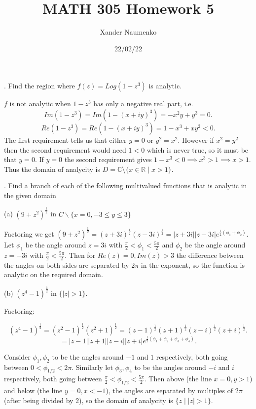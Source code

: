 \documentclass[letterpaper, reqno,11pt]{article}
\begin{document}
\title{MATH 305 Homework 5}
\date{22/02/22}
\author{Xander Naumenko}
\maketitle

 
.  Find the region where $ f(z) =Log (1-z^3)$ is analytic.

\medskip

$f$ is not analytic when $1-z^3$ has only a negative real part, i.e.
\[
Im(1-z^3)=Im(1-(x+iy)^3)=-x^2y+y^3=0
.\]
\[
Re(1-z^3)=Re(1-(x+iy)^3)=1-x^3+xy^2<0
.\]
The first requirement tells us that either $y=0$ or $y^2=x^2$. However if $x^2=y^2$ then the second requirement would need $1<0$ which is never true, so it must be that $y=0$. If $y=0$ the second requirement gives $1-x^3<0\implies x^3>1\implies x>1$. Thus the domain of analycity is $D=\mathbb{C}\setminus \{x\in\mathbb{R} \mid x>1\} $. 


\medskip

. Find a branch of each of the following multivalued functions that is analytic in the given domain

(a) $ (9+z^2)^{\frac{1}{2}}$ in $C \backslash \{ x=0,  -3\leq y \leq 3 \}$

Factoring we get $(9+z^2)^{\frac{1}{2}}=(z+3i)^{\frac{1}{2}}(z-3i)^{\frac{1}{2}}=|z+3i||z-3i|e^{\frac{1}{2}\left( \phi_1+\phi_2 \right) }$. Let $\phi_1$ be the angle around $z=3i$ with $\frac{\pi}{2}<\phi_1<\frac{5\pi}{2}$ and $\phi_2$ be the angle around $z=-3i$ with $\frac{\pi}{2}<\frac{5\pi}{2}$. Then for $Re(z)=0, Im(z)>3$ the difference between the angles on both sides are separated by $2\pi$ in the exponent, so the function is analytic on the required domain. 

(b) $ (z^4-1)^{\frac{1}{2}}$ in $ \{ |z|>1 \}$.

Factoring: 

\[
    (z^{4}-1)^{\frac{1}{2}}=(z^2-1)^{\frac{1}{2}}(z^2+1)^{\frac{1}{2}}=(z-1)^{\frac{1}{2}}(z+1)^{\frac{1}{2}}(z-i)^{\frac{1}{2}}(z+i)^{\frac{1}{2}}
.\]
\[
=|z-1| |z+1| |z-i||z+i|e^{\frac{1}{2}\left( \phi_1+\phi_2+\phi_3+\phi_4 \right) }
.\]

Consider $\phi_1, \phi_2$ to be the angles around $-1$ and $1$ respectively, both going between $0<\phi_{1/2}<2\pi$. Similarly let $\phi_3, \phi_4$ to be the angles around $-i$ and $i$ respectively, both going between $\frac{\pi}{2}<\phi_{1/2}<\frac{5\pi}{2}$. Then above (the line $x=0,y>1$) and below (the line $y=0, x<-1$), the angles are separated by multiples of $2\pi$ (after being divided by 2), so the domain of analycity is $\{z\mid |z|>1\} $. 
\end{document}

